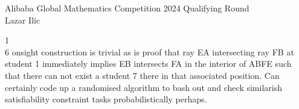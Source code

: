 \Large
Alibaba Global Mathematics Competition 2024 Qualifying Round \\
Lazar Ilic


1 \\
$\boxed{6}$ onsight construction is trivial as is proof that ray EA intersecting ray FB at student 1 immediately implies EB intersects FA in the interior of ABFE such that there can not exist a student 7 there in that associated position. Can certainly code up a randomised algorithm to bash out and check similarish satisfiability constraint tasks probabilistically perhaps.

